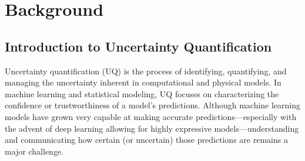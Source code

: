 \newcommand{\ba}[1]{\textbf{\sffamily #1}}

\newcommand{\sat}[0]{\ba{SAT}\xspace}
\newcommand{\satersr}[0]{\ba{SAT+ER+SR}\xspace}
\newcommand{\msp}[0]{\ba{MSP}\xspace}
\newcommand{\sr}[0]{\ba{SR}\xspace}
\newcommand{\sn}[0]{\ba{SN}\xspace}
\newcommand{\dg}[0]{\ba{DG}\xspace}
\newcommand{\odist}[0]{\ba{ODIST}\xspace}
\newcommand{\mcdo}[0]{\ba{MC-DO}\xspace}
\newcommand{\de}[0]{\ba{DE}\xspace}
\newcommand{\nntd}[0]{\ba{NNTD}\xspace}
\newcommand{\sctdde}[0]{\ba{DE+SCTD}\xspace}
\newcommand{\sctd}[0]{\ba{SCTD}\xspace}
\newcommand{\sptd}[0]{\ba{SPTD}\xspace}
\newcommand{\cclsc}[0]{\ba{CCL-SC}\xspace}
\newcommand{\aucoc}[0]{\ba{AUCOC}\xspace}
\newcommand{\temp}[0]{\ba{TEMP}\xspace}


\newcommand{\sptdde}[0]{\ba{DE+SPTD}\xspace}
\newcommand{\sptdc}[0]{\ba{SPTD-C}\xspace}
\newcommand{\sptdr}[0]{\ba{SPTD-R}\xspace}
\newcommand{\sptdts}[0]{\ba{SPTD-TS}\xspace}
\newcommand{\osp}[0]{\ba{OSP}\xspace}
\newcommand{\logitvar}[0]{\ba{LOGITVAR}\xspace}

\newcommand{\minscore}[0]{minimum score\xspace}
\newcommand{\avgscore}[0]{average score\xspace}
\newcommand{\jmpscore}[0]{jump score\xspace}
\newcommand{\varscore}[0]{variance score\xspace}
\newcommand{\smin}[0]{$s_\text{min}$\xspace}
\newcommand{\savg}[0]{$s_\text{avg}$\xspace}
\newcommand{\smax}[0]{$s_\text{MAX}$\xspace}
\newcommand{\ssum}[0]{$s_\text{SUM}$\xspace}
\newcommand{\swv}[0]{$s_\text{WV}$\xspace}
\newcommand{\swvr}[0]{$s_\text{WVR}$\xspace}
\newcommand{\swvts}[0]{$s_\text{WVTS}$\xspace}
\newcommand{\slast}[0]{$s_\text{last}$\xspace}
\newcommand{\sfull}[0]{$s_\text{full}$\xspace}
\newcommand{\sjmp}[0]{$s_\text{jmp}$\xspace}
\newcommand{\svar}[0]{$s_\text{var}$\xspace}
\newcommand{\fp}[0]{false-positive\xspace}
\newcommand{\fps}[0]{false-positives\xspace}
\newcommand{\ie}[0]{i.e.,\xspace}
\newcommand{\eg}[0]{e.g.,\xspace}
\newcommand{\selc}[0]{selective classification\xspace}
\newcommand{\selp}[0]{selective prediction\xspace}
\newcommand{\empiricalacccovtradeoff}[0]{$\text{acc}_{c}(f,g)$}
\newcommand{\upperbound}[0]{$\overline{\text{acc}}(a_\text{full},c)$}
\newcommand{\accnormscore}[0]{$s_{a_\text{full}}(f,g)$}
\newcommand{\realtradeoff}[0]{$\text{acc}_c(h,g)$}

\chapter{Background}
\label{ch:background}

\section{Introduction to Uncertainty Quantification}
Uncertainty quantification (UQ) is the process of identifying, quantifying, and managing the uncertainty inherent in computational and physical models. In machine learning and statistical modeling, UQ focuses on characterizing the confidence or trustworthiness of a model's predictions. Although machine learning models have grown very capable at making accurate predictions---especially with the advent of deep learning allowing for highly expressive models---understanding and communicating how certain (or uncertain) those predictions are remains a major challenge.

